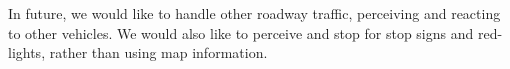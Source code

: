 \documentclass[letterpaper, 10 pt, conference]{ieeeconf}  %
\begin{document}
In future, we would like to handle other roadway traffic, perceiving and reacting to other vehicles. We would also like to perceive and stop for stop signs and red-lights,
rather than using map information.





\end{document}
